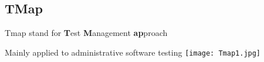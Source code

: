 \subsection{TMap}
Tmap stand for \textbf{T}est \textbf{M}anagement \textbf{ap}proach

Mainly applied to administrative software testing
\texttt{[image: Tmap1.jpg]}

